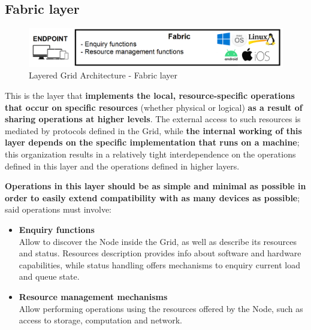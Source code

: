 \subsection{Fabric layer}
\begin{figure}[!ht]
    \centering
    \includegraphics[scale=0.35]{document/chapters/chapter_2/images/fabric_layer.png}
    \caption{Layered Grid Architecture - Fabric layer}
    \label{fig:fabric_layer}
\end{figure}

\noindent This is the layer that \textbf{implements the local, resource-specific operations that occur on specific resources} (whether physical or logical) \textbf{as a result of sharing operations at higher levels}. The external access to such resources is mediated by protocols defined in the Grid, while \textbf{the internal working of this layer depends on the specific implementation that runs on a machine}; this organization results in a relatively tight interdependence on the operations defined in this layer and the operations defined in higher layers.
\vspace{30mm}

\textbf{Operations in this layer should be as simple and minimal as possible in order to easily extend compatibility with as many devices as possible}; said operations must involve:
\begin{itemize}
    \item \textbf{Enquiry functions}\\
    Allow to discover the Node inside the Grid, as well as describe its resources and status. Resources description provides info about software and hardware capabilities, while status handling offers mechanisms to enquiry current load and queue state.
    \item \textbf{Resource management mechanisms}\\
    Allow performing operations using the resources offered by the Node, such as access to storage, computation and network.
\end{itemize} 
\vspace{5mm}

